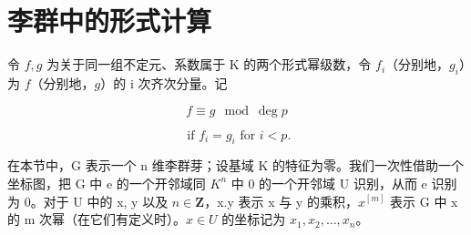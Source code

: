 \section{李群中的形式计算}

令 \(f, g\) 为关于同一组不定元、系数属于 K 的两个形式幂级数，令 \(f_i\)（分别地，\(g_i\)）为 \(f\)（分别地，\(g\)）的 i 次齐次分量。记

\[
f \equiv g \mod \deg p
\]

\[
\text { if } f _ {i} = g _ {i} \text { for } i <   p.
\]

在本节中，G 表示一个 n 维李群芽；设基域 K 的特征为零。我们一次性借助一个坐标图，把 G 中 e 的一个开邻域同 \(K^{n}\) 中 0 的一个开邻域 U 识别，从而 e 识别为 0。对于 U 中的 x, y 以及 \(n \in \mathbf{Z}\)，x.y 表示 x 与 y 的乘积，\(x^{[m]}\) 表示 G 中 x 的 m 次幂（在它们有定义时）。\(x \in U\) 的坐标记为 \(x_{1}, x_{2}, \ldots, x_{n}\)。

